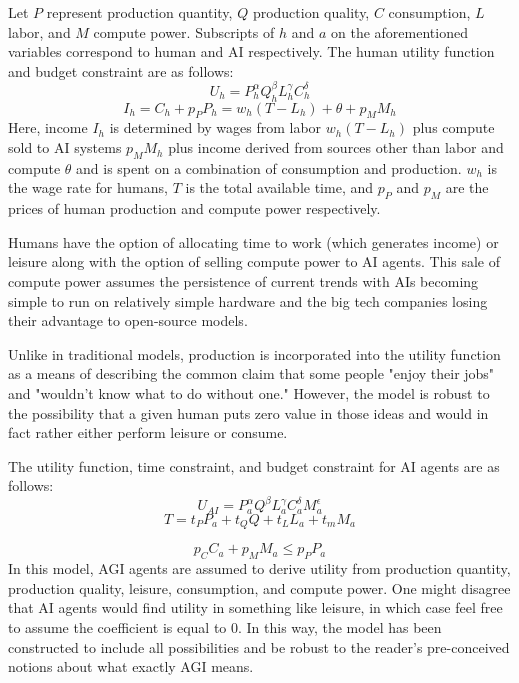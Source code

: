\documentclass{article}[10pt]
\begin{document}
Let $P$ represent production quantity, $Q$ production quality, $C$ consumption, $L$ labor, and $M$ compute power.
Subscripts of $h$ and $a$ on the aforementioned variables correspond to human and AI respectively.
The human utility function and budget constraint are as follows:
\begin{equation}
    U_h = P_h^\alpha Q_h^\beta L_h^\gamma C_h^\delta
\end{equation} 
\begin{equation}
    I_h = C_h + p_P P_h = w_h (T - L_h) + \theta +p_M M_h
\end{equation}
Here, income $I_h$ is determined by wages from labor $w_h(T-L_h)$ plus compute sold to AI systems $p_M M_h$ plus income derived from sources other than labor and compute $\theta$ and is spent on a combination of consumption and production. $w_h$ is the wage rate for humans, $T$ is the total available time, and $p_P$ and $p_M$ are the prices of human production and compute power respectively.\par

Humans have the option of allocating time to work (which generates income) or leisure along with the option of selling compute power to AI agents.
This sale of compute power assumes the persistence of current trends with AIs becoming simple to run on relatively simple hardware and the big tech companies losing their advantage to open-source models.\par

Unlike in traditional models, production is incorporated into the utility function as a means of describing the common claim that some people "enjoy their jobs" and "wouldn't know what to do without one."
However, the model is robust to the possibility that a given human puts zero value in those ideas and would in fact rather either perform leisure or consume.\par

The utility function, time constraint, and budget constraint for AI agents are as follows:
\begin{equation}
    U_{AI} = P_a^\alpha Q^\beta  L_a^\gamma C_a^\delta M_a^\epsilon
\end{equation} 
\begin{equation}
    T = t_P P_a + t_Q Q + t_L L_a + t_m M_a
\end{equation} 

\begin{equation}
    p_C C_a + p_M M_a  \leq p_P P_a
\end{equation}
In this model, AGI agents are assumed to derive utility from production quantity, production quality, leisure, consumption, and compute power.
One might disagree that AI agents would find utility in something like leisure, in which case feel free to assume the coefficient is equal to 0.
In this way, the model has been constructed to include all possibilities and be robust to the reader's pre-conceived notions about what exactly AGI means.\par
\end{document}
